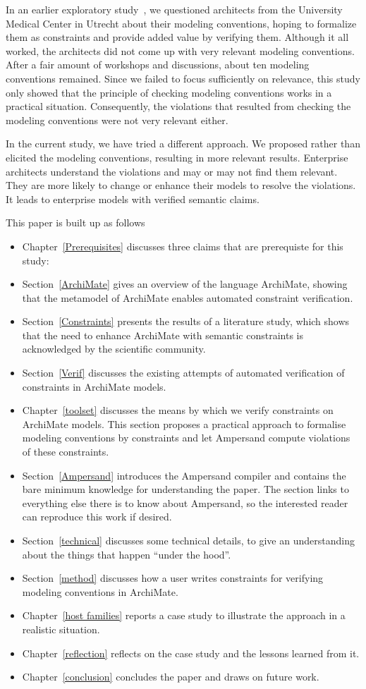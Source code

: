 \documentclass[sn-vancouver]{sn-jnl}%
\theoremstyle{thmstyleone}%
\theoremstyle{thmstyletwo}%
\theoremstyle{thmstylethree}%
\begin{document}
In an earlier exploratory study~\cite{iceis22}, we questioned architects from the University Medical Center in Utrecht about their modeling conventions,
hoping to formalize them as constraints and provide added value by verifying them.
Although it all worked, the architects did not come up with very relevant modeling conventions.
After a fair amount of workshops and discussions, about ten modeling conventions remained.
Since we failed to focus sufficiently on relevance, this study only showed that the principle of checking modeling conventions works in a practical situation.
Consequently, the violations that resulted from checking the modeling conventions were not very relevant either.

In the current study, we have tried a different approach.
We proposed rather than elicited the modeling conventions,
resulting in more relevant results.
Enterprise architects understand the violations and may or may not find them relevant.
They are more likely to change or enhance their models to resolve the violations.
It leads to enterprise models with verified semantic claims.

This paper is built up as follows
\begin{itemize}
\item Chapter~\ref{Prerequisites} discusses three claims that are prerequiste for this study:
\item
Section~\ref{ArchiMate} gives an overview of the language ArchiMate, showing that the metamodel of ArchiMate enables automated constraint verification.
\item
Section~\ref{Constraints} presents the results of a literature study, which shows that the need to enhance ArchiMate with semantic constraints is acknowledged by the scientific community.
\item
Section~\ref{Verif} discusses the existing attempts of automated verification of constraints in ArchiMate models.
\item
Chapter~\ref{toolset} discusses the means by which we verify constraints on ArchiMate models.
This section proposes a practical approach to formalise modeling conventions by constraints and let Ampersand compute violations of these constraints.
\item
Section~\ref{Ampersand} introduces the Ampersand compiler and contains the bare minimum knowledge for understanding the paper.
The section links to everything else there is to know about Ampersand, so the interested reader can reproduce this work if desired.
\item
Section~\ref{technical} discusses some technical details, to give an understanding about the things that happen ``under the hood''.
\item
Section~\ref{method} discusses how a user writes constraints for verifying modeling conventions in ArchiMate.
\item
Chapter~\ref{host families} reports a case study to illustrate the approach in a realistic situation.
\item
Chapter~\ref{reflection} reflects on the case study and the lessons learned from it.
\item
Chapter~\ref{conclusion} concludes the paper and draws on future work.
\end{itemize}
\end{document}
